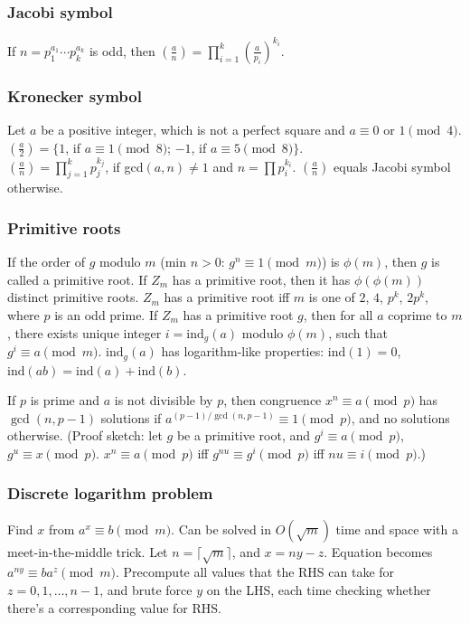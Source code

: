 \begin{small}
\subsubsection{Jacobi symbol}  %
If $n=p_1^{a_1} \cdots p_k^{a_k}$ is odd, then
$\left(\frac{a}{n}\right) = \prod_{i=1}^k \left(\frac{a}{p_i}\right)^{k_i}$.

\subsubsection{Kronecker symbol}
Let $a$ be a positive integer, which is not a perfect square and
$a \equiv 0$ or $1 {\pmod 4}$. \\
$\left(\frac{a}{2}\right) = \{ 1$, if $a \equiv 1 {\pmod 8}$;
$-1$, if $a \equiv 5 {\pmod 8} \}$. \\
$\left(\frac{a}{n}\right) = \prod_{j=1}^k p_j^{k_j}$,
if gcd$(a,n) \ne 1$ and $n=\prod p_i^{k_i}$.
$\left(\frac{a}{n}\right)$ equals Jacobi symbol otherwise.

\subsubsection{Primitive roots}  If the order of $g$ modulo $m$ (min $n>0$:
$g^n \equiv 1 \pmod{m}$) is $\phi(m)$, then $g$ is called a primitive root.
If $Z_m$ has a primitive root, then it has $\phi(\phi(m))$ distinct primitive
roots. $Z_m$ has a primitive root iff $m$ is one of $2$, $4$,
$p^k$, $2p^k$, where $p$ is an odd prime.
If $Z_m$ has a primitive root $g$, then for all $a$ coprime to $m$,
there exists unique integer $i=\text{ind}_g(a)$ modulo $\phi(m)$,
such that $g^i \equiv a \pmod{m}$.
$\text{ind}_g(a)$ has logarithm-like properties:
$\text{ind}(1) = 0$, $\text{ind}(ab) = \text{ind}(a) + \text{ind}(b)$.

If $p$ is prime and $a$ is not divisible by $p$, then congruence
$x^n \equiv a \pmod{p}$ has $\gcd(n, p-1)$ solutions if
$a^{(p-1)/\gcd(n,p-1)} \equiv 1 \pmod{p}$, and no solutions otherwise.
(Proof sketch: let $g$ be a primitive root, and
$g^i \equiv a \pmod{p}$, $g^u \equiv x \pmod{p}$.
$x^n \equiv a \pmod{p}$ iff $g^{nu} \equiv g^i \pmod{p}$ iff $nu \equiv i \pmod{p}$.)

\subsubsection{Discrete logarithm problem}  Find $x$ from $a^x \equiv b \pmod{m}$.
Can be solved in $O(\sqrt{m})$ time and space with a meet-in-the-middle trick.
Let $n = \lceil \sqrt{m} \rceil$, and $x = ny - z$.
Equation becomes $a^{ny} \equiv b a^z \pmod{m}$.  Precompute all values that
the RHS can take for $z = 0, 1, \dots, n-1$, and brute force $y$ on the LHS,
each time checking whether there's a corresponding value for RHS.


\end{small}
